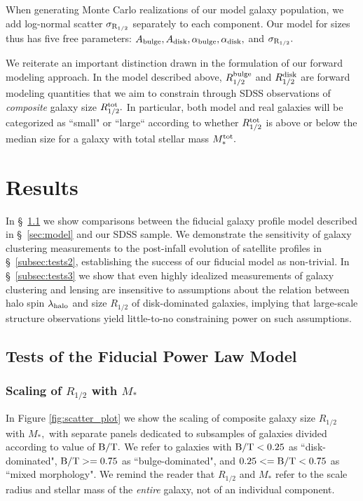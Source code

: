 \documentclass[usenatbib,usegraphicx,letterpaper]{mn2e}
\newcommand{\rhalf}{R_{1/2}}
\newcommand{\rhalftot}{R^{\rm tot}_{1/2}}
\newcommand{\rhalfdisk}{R_{1/2}^{\rm disk}}
\newcommand{\rhalfbulge}{R_{1/2}^{\rm bulge}}
\newcommand{\adisk}{A_{\rm disk}}
\newcommand{\abulge}{A_{\rm bulge}}
\newcommand{\alphadisk}{\alpha_{\rm disk}}
\newcommand{\alphabulge}{\alpha_{\rm bulge}}
\newcommand{\sigmarhalf}{\sigma_{\rm R_{1/2}}}
\newcommand{\bt}{{\rm B/T}}
\newcommand{\mstar}{M_{\ast}}
\newcommand{\mstartot}{M^{\rm tot}_{\ast}}
\newcommand{\halospin}{\lambda_{\rm halo}}
\begin{document}
When generating Monte Carlo realizations of our model galaxy population, we add log-normal scatter $\sigmarhalf$ separately to each component. Our model for sizes thus has five free parameters: $\abulge, \adisk, \alphabulge, \alphadisk,$ and $\sigmarhalf.$

We reiterate an important distinction drawn in the formulation of our forward modeling approach. In the model described above, $\rhalfbulge$ and $\rhalfdisk$ are forward modeling quantities that we aim to constrain through SDSS observations of {\em composite} galaxy size $\rhalftot.$ In particular, both model and real galaxies will be categorized as ``small" or ``large`` according to whether $\rhalftot$ is above or below the median size for a galaxy with total stellar mass $\mstartot.$

\section{Results}
\label{sec:results}

In \S~\ref{subsec:tests1} we show comparisons between the fiducial galaxy profile model described in \S~\ref{sec:model} and our SDSS sample. We demonstrate the sensitivity of galaxy clustering measurements to the post-infall evolution of satellite profiles in \S~\ref{subsec:tests2}, establishing the success of our fiducial model as non-trivial. In \S~\ref{subsec:tests3} we show that even highly idealized measurements of galaxy clustering and lensing are insensitive to assumptions about the relation between halo spin $\halospin$ and size $\rhalf$ of disk-dominated galaxies, implying that large-scale structure observations yield little-to-no constraining power on such assumptions.

\subsection{Tests of the Fiducial Power Law Model}
\label{subsec:tests1}

\subsubsection{Scaling of $\rhalf$ with $\mstar$}
\label{subsubsec:scaling_relation}

In Figure \ref{fig:scatter_plot} we show the scaling of composite galaxy size $\rhalf$ with $\mstar,$ with separate panels dedicated to subsamples of galaxies divided according to value of $\bt.$ We refer to galaxies with $\bt<0.25$ as ``disk-dominated", $\bt>=0.75$ as ``bulge-dominated", and $0.25<=\bt<0.75$ as ``mixed morphology". We remind the reader that $\rhalf$ and $\mstar$ refer to the scale radius and stellar mass of the {\em entire} galaxy, not of an individual component.
\end{document}
